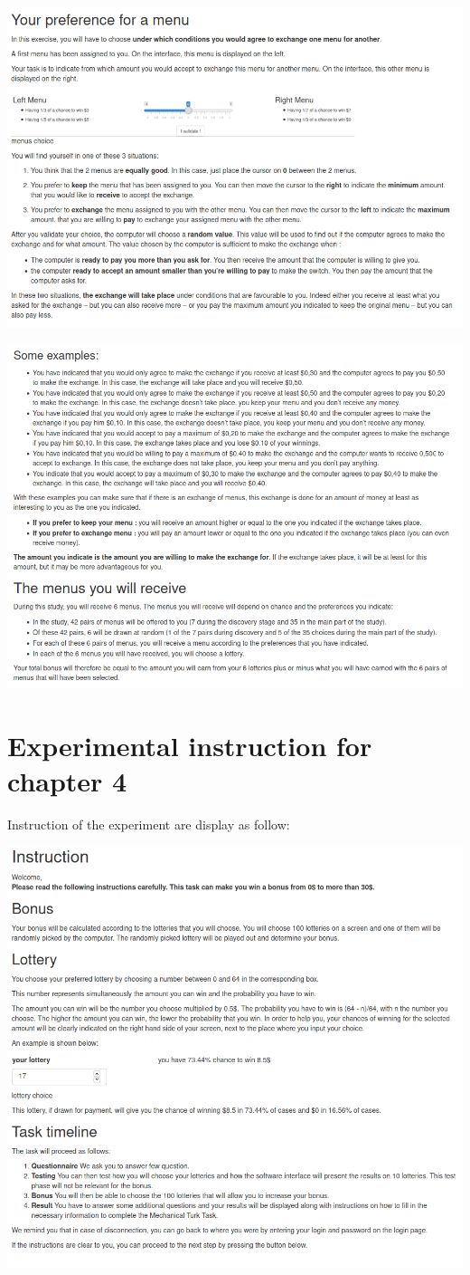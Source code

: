 \documentclass[
]{book}
\begin{document}
\includegraphics[width=0.9\linewidth]{annexe_file/consigne_c3_2}

\includegraphics[width=0.9\linewidth]{annexe_file/consigne_c3_3}

\hypertarget{expe-instruc4}{%
\chapter{Experimental instruction for chapter 4}\label{expe-instruc4}}

Instruction of the experiment are display as follow:

\includegraphics[width=0.9\linewidth,height=1.2\textheight]{annexe_file/consigne_c4}

  
\end{document}
